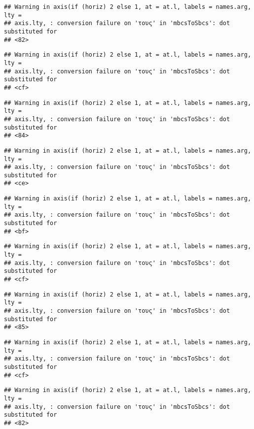 \documentclass[
]{article}
\begin{document}
\begin{verbatim}
## Warning in axis(if (horiz) 2 else 1, at = at.l, labels = names.arg, lty =
## axis.lty, : conversion failure on 'τους' in 'mbcsToSbcs': dot substituted for
## <82>
\end{verbatim}

\begin{verbatim}
## Warning in axis(if (horiz) 2 else 1, at = at.l, labels = names.arg, lty =
## axis.lty, : conversion failure on 'τους' in 'mbcsToSbcs': dot substituted for
## <cf>
\end{verbatim}

\begin{verbatim}
## Warning in axis(if (horiz) 2 else 1, at = at.l, labels = names.arg, lty =
## axis.lty, : conversion failure on 'τους' in 'mbcsToSbcs': dot substituted for
## <84>
\end{verbatim}

\begin{verbatim}
## Warning in axis(if (horiz) 2 else 1, at = at.l, labels = names.arg, lty =
## axis.lty, : conversion failure on 'τους' in 'mbcsToSbcs': dot substituted for
## <ce>
\end{verbatim}

\begin{verbatim}
## Warning in axis(if (horiz) 2 else 1, at = at.l, labels = names.arg, lty =
## axis.lty, : conversion failure on 'τους' in 'mbcsToSbcs': dot substituted for
## <bf>
\end{verbatim}

\begin{verbatim}
## Warning in axis(if (horiz) 2 else 1, at = at.l, labels = names.arg, lty =
## axis.lty, : conversion failure on 'τους' in 'mbcsToSbcs': dot substituted for
## <cf>
\end{verbatim}

\begin{verbatim}
## Warning in axis(if (horiz) 2 else 1, at = at.l, labels = names.arg, lty =
## axis.lty, : conversion failure on 'τους' in 'mbcsToSbcs': dot substituted for
## <85>
\end{verbatim}

\begin{verbatim}
## Warning in axis(if (horiz) 2 else 1, at = at.l, labels = names.arg, lty =
## axis.lty, : conversion failure on 'τους' in 'mbcsToSbcs': dot substituted for
## <cf>
\end{verbatim}

\begin{verbatim}
## Warning in axis(if (horiz) 2 else 1, at = at.l, labels = names.arg, lty =
## axis.lty, : conversion failure on 'τους' in 'mbcsToSbcs': dot substituted for
## <82>
\end{verbatim}
\end{document}
